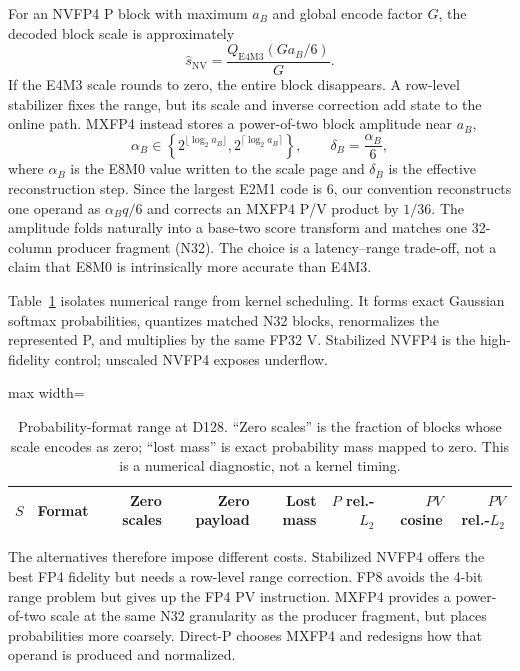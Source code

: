 For an NVFP4 P block with maximum $a_B$ and global encode factor $G$, the
decoded block scale is approximately
\begin{equation}
  \widehat s_{\mathrm{NV}}=
  \frac{Q_{\mathrm{E4M3}}(G a_B/6)}{G}.
  \label{eq:nv-scale}
\end{equation}
If the E4M3 scale rounds to zero, the entire block disappears. A row-level
stabilizer fixes the range, but its scale and inverse correction add state to
the online path. MXFP4 instead stores a power-of-two block amplitude near
$a_B$,
\begin{equation}
  \alpha_B\in
  \left\{2^{\lfloor\log_2 a_B\rfloor},
          2^{\lceil\log_2 a_B\rceil}\right\},
  \qquad \delta_B=\frac{\alpha_B}{6},
  \label{eq:mx-scale}
\end{equation}
where $\alpha_B$ is the E8M0 value written to the scale page and $\delta_B$
is the effective reconstruction step.  Since the largest E2M1 code is 6, our
convention reconstructs one operand as $\alpha_B q/6$ and corrects an MXFP4
P/V product by $1/36$.  The amplitude folds naturally into a base-two score
transform and matches one 32-column producer fragment (N32). The choice is a
latency--range trade-off, not a claim that E8M0 is intrinsically more accurate
than E4M3.

Table~\ref{tab:p-range} isolates numerical range from kernel scheduling. It
forms exact Gaussian softmax probabilities, quantizes matched N32 blocks,
renormalizes the represented P, and multiplies by the same FP32 V. Stabilized
NVFP4 is the high-fidelity control; unscaled NVFP4 exposes underflow.

\begin{table}[htbp]
\centering
\caption{Probability-format range at D128. ``Zero scales'' is the fraction
of blocks whose scale encodes as zero; ``lost mass'' is exact probability
mass mapped to zero. This is a numerical diagnostic, not a kernel timing.}
\label{tab:p-range}
\scriptsize
\begin{adjustbox}{max width=\textwidth}
\begin{tabular}{llrrrrrr}
\toprule
$S$ & Format & Zero scales & Zero payload & Lost mass & $P$ rel.-$L_2$
& $PV$ cosine & $PV$ rel.-$L_2$ \\
\midrule
%
\end{tabular}
\end{adjustbox}
\end{table}

The alternatives therefore impose different costs.  Stabilized NVFP4 offers
the best FP4 fidelity but needs a row-level range correction.  FP8 avoids the
4-bit range problem but gives up the FP4 PV instruction.  MXFP4 provides a
power-of-two scale at the same N32 granularity as the producer fragment, but
places probabilities more coarsely.  Direct-P chooses MXFP4 and redesigns how
that operand is produced and normalized.
